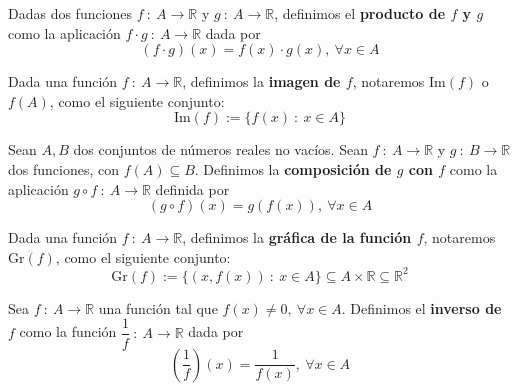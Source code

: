 \begin{definicion}
    Dadas dos funciones $f ~:~ A \longrightarrow \mathbb{R}$ y $g ~:~ A \longrightarrow \mathbb{R}$,
    definimos el \textbf{producto de $f$ y $g$} como la aplicación $f \cdot g ~:~ A \longrightarrow \mathbb{R}$ dada por
    \begin{equation*}
        (f \cdot g)(x) = f(x) \cdot g(x), ~ \forall x \in A
    \end{equation*}
\end{definicion}

\begin{definicion}
    Dada una función $f ~:~ A \longrightarrow \mathbb{R}$, definimos la \textbf{imagen de $f$}, notaremos $\text{Im}(f)$ o $f(A)$,
    como el siguiente conjunto:
    \begin{equation*}
        \text{Im}(f):= \{f(x) ~:~ x \in A\}
    \end{equation*}
\end{definicion}

\begin{definicion}
    Sean $A,B$ dos conjuntos de números reales no vacíos. Sean $f ~:~ A \longrightarrow \mathbb{R}$ y $g ~:~ B \longrightarrow \mathbb{R}$ dos funciones,
    con $f(A) \subseteq B$. Definimos la \textbf{composición de $g$ con $f$} como
    la aplicación $g \circ f ~:~ A \longrightarrow \mathbb{R}$ definida por
    \begin{equation*}
        (g \circ f)(x) = g(f(x)), ~ \forall x \in A
    \end{equation*}
\end{definicion}

\begin{definicion}
    Dada una función $f ~:~ A \longrightarrow \mathbb{R}$, definimos la \textbf{gráfica de la función $f$}, notaremos $\text{Gr}(f)$,
    como el siguiente conjunto:
    \begin{equation*}
        \text{Gr}(f) := \{(x,f(x)) ~:~ x \in A\} \subseteq A \times \mathbb{R} \subseteq \mathbb{R}^2
    \end{equation*}
\end{definicion}

\begin{definicion}
    Sea $f ~:~ A \longrightarrow \mathbb{R}$ una función tal que $f(x) \neq 0, ~ \forall x \in A$.
    Definimos el \textbf{inverso de $f$} como la función $\dfrac{1}{f} ~:~ A \longrightarrow \mathbb{R}$ dada por
    \begin{equation*}
        \left( \frac{1}{f} \right)(x) = \frac{1}{f(x)}, ~ \forall x \in A
    \end{equation*}
\end{definicion}

